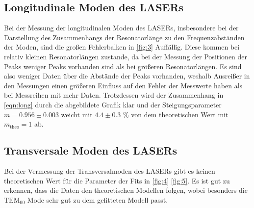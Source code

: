 \subsection{Longitudinale Moden des LASERs}
Bei der Messung der longitudinalen Moden des LASERs, insbesondere bei der Darstellung des Zusammenhangs der Resonatorlänge zu den Frequenzabständen der Moden, sind die großen Fehlerbalken in \autoref{fig:3} Auffällig.
Diese kommen bei relativ kleinen Resonatorlängen zustande, da bei der Messung der Positionen der Peaks weniger Peaks vorhanden sind als bei größeren Resonatorlängen. Es sind also weniger Daten über die Abstände der Peaks vorhanden, weshalb Ausreißer in den Messungen einen größeren Einfluss auf den Fehler der Messwerte haben als bei Messreihen mit mehr Daten.
Trotzdessen wird der Zusammenhang in \autoref{eqn:long} durch die abgebildete Grafik klar und der Steigungsparameter $m = 0.956 \pm 0.003$ weicht mit $4.4 \pm 0.3 \, \, \%$ von dem theoretischen Wert mit $m_\text{theo} = 1$ ab.
\subsection{Transversale Moden des LASERs}
Bei der Vermessung der Transversalmoden des LASERs gibt es keinen theoretischen Wert für die Parameter der Fits in \autoref{fig:4} \autoref{fig:5}. Es ist gut zu erkennen, dass die Daten den theoretischen Modellen folgen, wobei besonders die $\text{TEM}_{00}$ Mode sehr gut zu dem gefitteten Modell passt.
\newpage